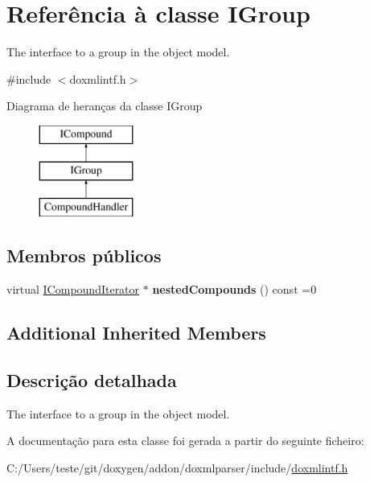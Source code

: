 \hypertarget{class_i_group}{\section{Referência à classe I\-Group}
\label{class_i_group}
}


The interface to a group in the object model.  




{\ttfamily \#include $<$doxmlintf.\-h$>$}

Diagrama de heranças da classe I\-Group\begin{figure}[H]
\begin{center}
\leavevmode
\includegraphics[height=3.000000cm]{class_i_group}
\end{center}
\end{figure}
\subsection*{Membros públicos}
\begin{DoxyCompactItemize}
\item 
\hypertarget{class_i_group_a6a1aab20f15a204af0b8d3e8470817bd}{virtual \hyperlink{class_i_compound_iterator}{I\-Compound\-Iterator} $\ast$ {\bfseries nested\-Compounds} () const =0}\label{class_i_group_a6a1aab20f15a204af0b8d3e8470817bd}

\end{DoxyCompactItemize}
\subsection*{Additional Inherited Members}


\subsection{Descrição detalhada}
The interface to a group in the object model. 

A documentação para esta classe foi gerada a partir do seguinte ficheiro\-:\begin{DoxyCompactItemize}
\item 
C\-:/\-Users/teste/git/doxygen/addon/doxmlparser/include/\hyperlink{include_2doxmlintf_8h}{doxmlintf.\-h}\end{DoxyCompactItemize}
